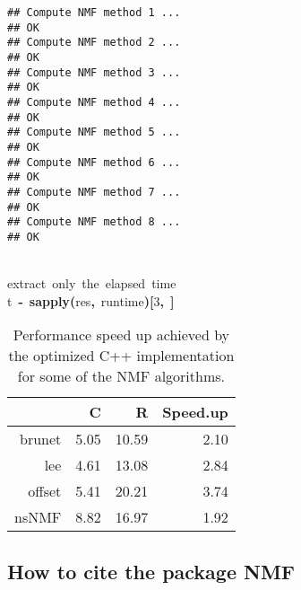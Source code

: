 \documentclass[a4paper]{article}\usepackage{graphicx, color}
\makeatletter
\newcommand{\hlnumber}[1]{\textcolor[rgb]{0,0,0}{#1}}%
\newcommand{\hlfunctioncall}[1]{\textcolor[rgb]{0.501960784313725,0,0.329411764705882}{\textbf{#1}}}%
\newcommand{\hlkeyword}[1]{\textcolor[rgb]{0,0,0}{\textbf{#1}}}%
\newcommand{\hlcomment}[1]{\textcolor[rgb]{0.180392156862745,0.6,0.341176470588235}{#1}}%
\newcommand{\hlassignement}[1]{\textcolor[rgb]{0,0,0}{\textbf{#1}}}%
\newcommand{\hlsymbol}[1]{\textcolor[rgb]{0,0,0}{#1}}%
\newcommand{\hlstd}[1]{\textcolor[rgb]{0,0,0}{#1}}%
\newenvironment{kframe}{%
 \def\FrameCommand##1{\hskip\@totalleftmargin \hskip-\fboxsep
 \colorbox{shadecolor}{##1}\hskip-\fboxsep
     \hskip-\linewidth \hskip-\@totalleftmargin \hskip\columnwidth}%
 \MakeFramed {\advance\hsize-\width
   \@totalleftmargin\z@ \linewidth\hsize
   \@setminipage}}%
 {\par\unskip\endMakeFramed}
\newenvironment{knitrout}{}{} %
\makeatother
\begin{document}
\begin{knitrout}
\begin{kframe}
\begin{flushleft}
\normalfont
\end{flushleft}
\begin{verbatim}
## Compute NMF method 1 ...
## OK
## Compute NMF method 2 ...
## OK
## Compute NMF method 3 ...
## OK
## Compute NMF method 4 ...
## OK
## Compute NMF method 5 ...
## OK
## Compute NMF method 6 ...
## OK
## Compute NMF method 7 ...
## OK
## Compute NMF method 8 ...
## OK
\end{verbatim}
\begin{flushleft}
\ttfamily\noindent
\hspace*{\fill}\\
\hlstd{}\hlcomment{\usebox{\hlnormalsizeboxhash}{\ }extract{\ }only{\ }the{\ }elapsed{\ }time}\hspace*{\fill}\\
\hlstd{}\hlsymbol{t}{\ }\hlassignement{\usebox{\hlnormalsizeboxlessthan}-}{\ }\hlfunctioncall{sapply}\hlkeyword{(}\hlsymbol{res}\hlkeyword{,}{\ }\hlsymbol{runtime}\hlkeyword{)}\hlkeyword{[}\hlnumber{3}\hlkeyword{,}{\ }\hlkeyword{]}\mbox{}
\normalfont
\end{flushleft}
\end{kframe}
\end{knitrout}



\begin{table}[ht]
\begin{center}
\begin{tabular}{rrrr}
  \hline
 & C & R & Speed.up \\ 
  \hline
brunet & 5.05 & 10.59 & 2.10 \\ 
  lee & 4.61 & 13.08 & 2.84 \\ 
  offset & 5.41 & 20.21 & 3.74 \\ 
  nsNMF & 8.82 & 16.97 & 1.92 \\ 
   \hline
\end{tabular}
\caption{Performance speed up achieved by the optimized C++ implementation for some of the NMF algorithms.}
\label{tab:perf}
\end{center}
\end{table}





\subsection{How to cite the package NMF}
\end{document}
